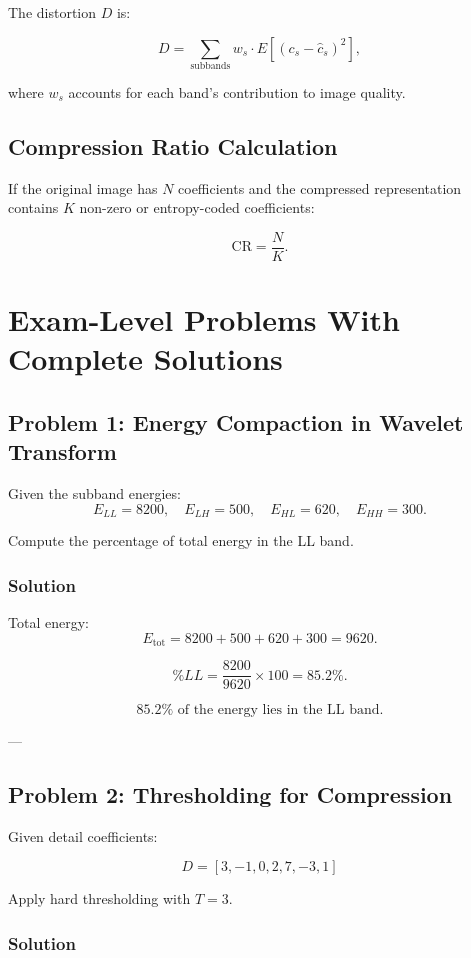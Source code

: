 \documentclass{AnantDocumentation}
\begin{document}
The distortion $D$ is:

\[
D = \sum_{\text{subbands}} w_s \cdot E[(c_s - \hat{c}_s)^2],
\]

where $w_s$ accounts for each band’s contribution to image quality.

\subsection{Compression Ratio Calculation}

If the original image has $N$ coefficients and the compressed representation contains $K$ non-zero or entropy-coded coefficients:

\[
\text{CR} = \frac{N}{K}.
\]

\newpage
\section*{Exam-Level Problems With Complete Solutions}

\subsection*{Problem 1: Energy Compaction in Wavelet Transform}

Given the subband energies:
\[
E_{LL}=8200,\quad E_{LH}=500,\quad E_{HL}=620,\quad E_{HH}=300.
\]

Compute the percentage of total energy in the LL band.

\subsubsection*{Solution}

Total energy:
\[
E_{\text{tot}} = 8200 + 500 + 620 + 300 = 9620.
\]

\[
\%LL = \frac{8200}{9620}\times 100 = 85.2\%.
\]

\[
\boxed{85.2\% \text{ of the energy lies in the LL band.}}
\]

---

\subsection*{Problem 2: Thresholding for Compression}

Given detail coefficients:

\[
D = [3, -1, 0, 2, 7, -3, 1]
\]

Apply hard thresholding with $T=3$.

\subsubsection*{Solution}
\end{document}
